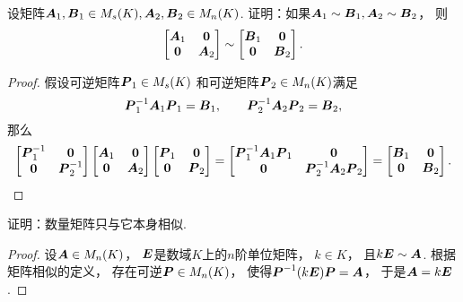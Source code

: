 \begin{example}\label{example:相似矩阵.分块对角矩阵的相似性}
设矩阵\(\boldsymbol{A}_1,\boldsymbol{B}_1 \in M_s(K),
\boldsymbol{A}_2,\boldsymbol{B}_2 \in M_n(K)\).
证明：如果\(\boldsymbol{A}_1 \sim \boldsymbol{B}_1,\boldsymbol{A}_2 \sim \boldsymbol{B}_2\)，
则\[
	\begin{bmatrix}
		\boldsymbol{A}_1 & \boldsymbol0 \\
		\boldsymbol0 & \boldsymbol{A}_2
	\end{bmatrix}
	\sim \begin{bmatrix}
		\boldsymbol{B}_1 & \boldsymbol0 \\
		\boldsymbol0 & \boldsymbol{B}_2
	\end{bmatrix}.
\]
\begin{proof}
假设可逆矩阵\(\boldsymbol{P}_1 \in M_s(K)\)
和可逆矩阵\(\boldsymbol{P}_2 \in M_n(K)\)满足\[
	\boldsymbol{P}_1^{-1} \boldsymbol{A}_1 \boldsymbol{P}_1 = \boldsymbol{B}_1,
	\qquad
	\boldsymbol{P}_2^{-1} \boldsymbol{A}_2 \boldsymbol{P}_2 = \boldsymbol{B}_2,
\]
那么\[
	\begin{bmatrix}
		\boldsymbol{P}_1^{-1} & \boldsymbol0 \\
		\boldsymbol0 & \boldsymbol{P}_2^{-1}
	\end{bmatrix}
	\begin{bmatrix}
		\boldsymbol{A}_1 & \boldsymbol0 \\
		\boldsymbol0 & \boldsymbol{A}_2
	\end{bmatrix}
	\begin{bmatrix}
		\boldsymbol{P}_1 & \boldsymbol0 \\
		\boldsymbol0 & \boldsymbol{P}_2
	\end{bmatrix}
	= \begin{bmatrix}
		\boldsymbol{P}_1^{-1} \boldsymbol{A}_1 \boldsymbol{P}_1 & \boldsymbol0 \\
		\boldsymbol0 & \boldsymbol{P}_2^{-1} \boldsymbol{A}_2 \boldsymbol{P}_2
	\end{bmatrix}
	= \begin{bmatrix}
		\boldsymbol{B}_1 & \boldsymbol0 \\
		\boldsymbol0 & \boldsymbol{B}_2
	\end{bmatrix}.
	\qedhere
\]
\end{proof}
\end{example}
\begin{example}
证明：数量矩阵只与它本身相似.
\begin{proof}
设\(\boldsymbol{A} \in M_n(K)\)，
\(\boldsymbol{E}\)是数域\(K\)上的\(n\)阶单位矩阵，
\(k \in K\)，
且\(k\boldsymbol{E} \sim \boldsymbol{A}\).
根据矩阵相似的定义，
存在可逆\(\boldsymbol{P} \in M_n(K)\)，
使得\(\boldsymbol{P}^{-1} (k\boldsymbol{E}) \boldsymbol{P} = \boldsymbol{A}\)，
于是\(\boldsymbol{A} = k\boldsymbol{E}\).
\end{proof}
\end{example}
